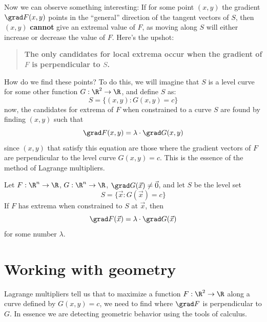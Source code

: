 \documentclass{ximera}
\begin{document}
Now we can observe something interesting: If for some point $(x,y)$
the gradient $\grad F(x,y)$ points in the ``general'' direction of the
tangent vectors of $S$, then $(x,y)$ \textbf{cannot} give an extremal
value of $F$, as moving along $S$ will either increase or decrease the
value of $F$. Here's the upshot:
\begin{quote}
  \textbf{The only candidates for local extrema occur when the
    gradient of $F$ is perpendicular to $S$.}
\end{quote}
How do we find these points? To do this, we will imagine that $S$ is a
level curve for some other function $G:\R^2\to\R$, and define $S$ as:
\[
S = \{(x,y):G(x,y)= c\}
\]
now, the candidates for extrema of $F$ when constrained to a curve $S$
are found by finding $(x,y)$ such that
\[
\grad F(x,y) =  \lambda \cdot \grad G(x,y)
\]
since $(x,y)$ that satisfy this equation are those where the gradient
vectors of $F$ are perpendicular to the level curve $G(x,y)= c$. This
is the essence of the method of Lagrange multipliers.

\begin{theorem}
  Let $F:\R^n\to\R$, $G:\R^n\to\R$, $\grad G(\vec{x}) \ne \vec{0}$,
  and let $S$ be the level set
  \[
  S = \{\vec{x}: G(\vec{x}) = c\}
  \]
  If $F$ has extrema when constrained to $S$ at $\vec{x}$, then
  \[
  \grad F(\vec{x}) = \lambda \cdot \grad G(\vec{x})
  \]
  for some number $\lambda$.
\end{theorem}


  


\section{Working with geometry}

Lagrange multipliers tell us that to maximize a function $F:\R^2\to\R$
along a curve defined by $G(x,y) = c$, we need to find where $\grad F$
is perpendicular to $G$. In essence we are detecting geometric
behavior using the tools of calculus.
\end{document}
